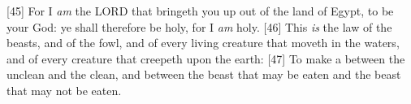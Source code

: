 [45] \textcolor[cmyk]{0.99998,1,0,0}{For I \emph{am} the LORD that bringeth you up out of the land of Egypt, to be your God: ye shall therefore be holy, for I \emph{am} holy.}
[46] \textcolor[cmyk]{0.99998,1,0,0}{This \emph{is} the law of the beasts, and of the fowl, and of every living creature that moveth in the waters, and of every creature that creepeth upon the earth:}
[47] \textcolor[cmyk]{0.99998,1,0,0}{To make a  between the unclean and the clean, and between the beast that may be eaten and the beast that may not be eaten.}
